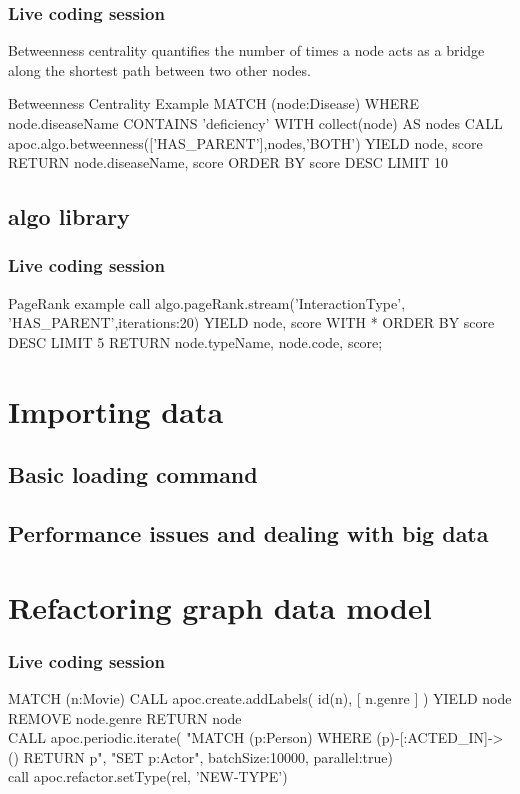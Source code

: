 \documentclass[12pt]{beamer}
\begin{document}
    \begin{frame}
        \frametitle{Live coding session}
        \begin{Definition}
            Betweenness centrality quantifies the number of times a node acts as a bridge along the shortest path between two other nodes.\footnotemark
        \end{Definition}
        \begin{block}{Betweenness Centrality Example}
            MATCH (node:Disease)
            WHERE node.diseaseName CONTAINS 'deficiency'
            WITH collect(node) AS nodes
            CALL apoc.algo.betweenness(['HAS_PARENT'],nodes,'BOTH') YIELD node, score
            RETURN node.diseaseName, score
            ORDER BY score DESC LIMIT 10
        \end{block}
    \end{frame}
    
    \subsection{algo library}
    \begin{frame}
        \frametitle{Live coding session}
        \begin{block}{PageRank example}
            call algo.pageRank.stream('InteractionType', 'HAS\_PARENT',{iterations:20}) YIELD node, score
            WITH * ORDER BY score DESC LIMIT 5
            RETURN node.typeName, node.code, score;
        \end{block}
    \end{frame}
    
    \section{Importing data}
    \subsection{Basic loading command}
    \subsection{Performance issues and dealing with big data}
    
    
    \section{Refactoring graph data model}
    \begin{frame}
        \frametitle{Live coding session}
        MATCH (n:Movie)
        CALL apoc.create.addLabels( id(n), [ n.genre ] ) YIELD node
        REMOVE node.genre
        RETURN node
        \\
        CALL apoc.periodic.iterate(
        "MATCH (p:Person) WHERE (p)-[:ACTED\_IN]->() RETURN p",
        "SET p:Actor", {batchSize:10000, parallel:true})
        \\
        call apoc.refactor.setType(rel, 'NEW-TYPE')
    \end{frame}
    
\end{document}

